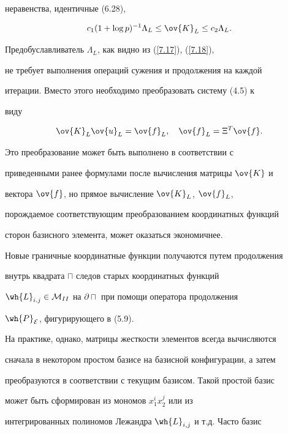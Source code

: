 неравенства, идентичные (6.28),


\begin{equation}\label{7.19}


c_1(1+ \log p)^{-1} \Lambda_L \leq \ov{K}_L \leq c_2 \Lambda_L.


\end{equation}


Предобуславливатель $\Lambda_L$, как видно из (\ref{7.17}), (\ref{7.18}), 


не требует выполнения операций сужения и продолжения на каждой 


итерации. Вместо этого необходимо преобразовать систему (4.5) к 


виду


\begin{equation}


\ov {K}_L\ov{u}_L=\ov{f}_L, \quad \ov{f}_L=\Xi^T \ov{f}.


\label{7.20}


\end{equation}


Это преобразование может быть выполнено в соответствии с 


приведенными ранее формулами после вычисления матрицы $\ov{K}$ и


вектора $\ov{f}$, но прямое вычисление $\ov{K}_L$, $\ov{f}_L$, 


порождаемое соответствующим преобразованием координатных функций 


сторон базисного элемента, может оказаться экономичнее. 


Новые граничные координатные функции получаются путем продолжения 


внутрь квадрата $\sqcap$ следов старых координатных функций 


$\wh{L}_{i.j}\in{ 


\cal M}_{II}$ на $\partial \sqcap$ при помощи оператора продолжения 


$\wh{P}_{{\cal E}}$, фигурирующего в (5.9). 


На практике, однако, матрицы жесткости элементов всегда вычисляются 


сначала в некотором простом базисе на базисной конфигурации, а затем 


преобразуются в соответствии с текущим базисом. Такой простой базис 


может быть сформирован из мономов $x^i_1x^j_2$ или из 


интегрированных полиномов Лежандра $\wh{L}_{i,j}$ и т.д. Часто базис 



